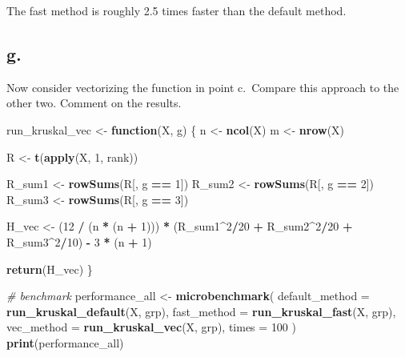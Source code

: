 \documentclass[
]{article}
\newenvironment{Shaded}{\begin{snugshade}}{\end{snugshade}}
\newcommand{\AttributeTok}[1]{\textcolor[rgb]{0.13,0.29,0.53}{#1}}
\newcommand{\CommentTok}[1]{\textcolor[rgb]{0.56,0.35,0.01}{\textit{#1}}}
\newcommand{\ControlFlowTok}[1]{\textcolor[rgb]{0.13,0.29,0.53}{\textbf{#1}}}
\newcommand{\DecValTok}[1]{\textcolor[rgb]{0.00,0.00,0.81}{#1}}
\newcommand{\FunctionTok}[1]{\textcolor[rgb]{0.13,0.29,0.53}{\textbf{#1}}}
\newcommand{\NormalTok}[1]{#1}
\newcommand{\OtherTok}[1]{\textcolor[rgb]{0.56,0.35,0.01}{#1}}
\newcommand{\SpecialCharTok}[1]{\textcolor[rgb]{0.81,0.36,0.00}{\textbf{#1}}}
\begin{document}
The fast method is roughly 2.5 times faster than the default method.

\subsection{g.}\label{g.}

Now consider vectorizing the function in point c.~Compare this approach
to the other two. Comment on the results.

\begin{Shaded}
\begin{Highlighting}[]
\NormalTok{run\_kruskal\_vec }\OtherTok{\textless{}{-}} \ControlFlowTok{function}\NormalTok{(X, g) \{}
\NormalTok{  n }\OtherTok{\textless{}{-}} \FunctionTok{ncol}\NormalTok{(X)}
\NormalTok{  m }\OtherTok{\textless{}{-}} \FunctionTok{nrow}\NormalTok{(X)}
  
\NormalTok{  R }\OtherTok{\textless{}{-}} \FunctionTok{t}\NormalTok{(}\FunctionTok{apply}\NormalTok{(X, }\DecValTok{1}\NormalTok{, rank))}
  
\NormalTok{  R\_sum1 }\OtherTok{\textless{}{-}} \FunctionTok{rowSums}\NormalTok{(R[, g }\SpecialCharTok{==} \DecValTok{1}\NormalTok{])}
\NormalTok{  R\_sum2 }\OtherTok{\textless{}{-}} \FunctionTok{rowSums}\NormalTok{(R[, g }\SpecialCharTok{==} \DecValTok{2}\NormalTok{])}
\NormalTok{  R\_sum3 }\OtherTok{\textless{}{-}} \FunctionTok{rowSums}\NormalTok{(R[, g }\SpecialCharTok{==} \DecValTok{3}\NormalTok{])}
  
\NormalTok{  H\_vec }\OtherTok{\textless{}{-}}\NormalTok{ (}\DecValTok{12} \SpecialCharTok{/}\NormalTok{ (n }\SpecialCharTok{*}\NormalTok{ (n }\SpecialCharTok{+} \DecValTok{1}\NormalTok{))) }\SpecialCharTok{*}\NormalTok{ (R\_sum1}\SpecialCharTok{\^{}}\DecValTok{2}\SpecialCharTok{/}\DecValTok{20} \SpecialCharTok{+}\NormalTok{ R\_sum2}\SpecialCharTok{\^{}}\DecValTok{2}\SpecialCharTok{/}\DecValTok{20} \SpecialCharTok{+}\NormalTok{ R\_sum3}\SpecialCharTok{\^{}}\DecValTok{2}\SpecialCharTok{/}\DecValTok{10}\NormalTok{) }\SpecialCharTok{{-}} \DecValTok{3} \SpecialCharTok{*}\NormalTok{ (n }\SpecialCharTok{+} \DecValTok{1}\NormalTok{)}
  
  \FunctionTok{return}\NormalTok{(H\_vec)}
\NormalTok{\}}

\CommentTok{\# benchmark}
\NormalTok{performance\_all }\OtherTok{\textless{}{-}} \FunctionTok{microbenchmark}\NormalTok{(}
  \AttributeTok{default\_method =} \FunctionTok{run\_kruskal\_default}\NormalTok{(X, grp),}
  \AttributeTok{fast\_method    =} \FunctionTok{run\_kruskal\_fast}\NormalTok{(X, grp),}
  \AttributeTok{vec\_method     =} \FunctionTok{run\_kruskal\_vec}\NormalTok{(X, grp),}
  \AttributeTok{times =} \DecValTok{100}
\NormalTok{)}
\FunctionTok{print}\NormalTok{(performance\_all)}
\end{Highlighting}
\end{Shaded}
\end{document}
